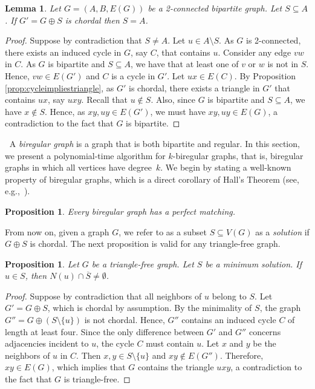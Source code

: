\documentclass[11pt]{article}
\newtheorem{lemma}[theorem]{Lemma}
\newtheorem{proposition}[theorem]{Proposition}
\theoremstyle{definition}
\begin{document}
\begin{lemma}\label{lemma:SsubseteqAthenS=A}
Let $G=(A,B,E(G))$ be a 2-connected bipartite graph. Let $S \subseteq A$.
If $G'=G \oplus S$ is chordal then $S=A$.
\end{lemma}
\begin{proof}
    Suppose by contradiction that 
    $S \neq  A$.
    Let $u \in A \setminus S$.
    As $G$ is 2-connected, there exists an induced cycle in $G$, say $C$, that contains $u$.
    Consider any edge $vw$ in $C$.
    As $G$ is bipartite and $S \subseteq A$, we have that at least one of $v$ or $w$ is not in $S$. Hence, $vw \in E(G')$ and $C$ is a cycle in $G'$.
    Let $ux \in E(C)$.
    By Proposition \ref{prop:cycleimpliestriangle}, as $G'$ is chordal, there exists a triangle in $G'$ that contains $ux$, say $uxy$.
    Recall that $u \notin S$.
    Also, since $G$ is bipartite and $S \subseteq A$, we have $x \notin S$. Hence, as $xy,uy \in E(G')$, we must have $xy,uy \in E(G)$, a contradiction to the fact that $G$ is bipartite.
\end{proof}

$~$
A \textit{biregular graph} is a graph that is both bipartite and regular.
In this section, we present a polynomial-time algorithm for $k$-biregular graphs, that is, biregular graphs in which all vertices have degree~$k$.
We begin by stating a well-known property of biregular graphs, which is a direct corollary of Hall’s Theorem (see, e.g.,~\cite{LovaszPlummer1986}).

\begin{proposition}\label{prop:regularbip-perfectmatch}
Every biregular graph has a perfect matching.
\end{proposition}

From now on, given a graph $G$, we refer to as a subset $S \subseteq V(G)$
as a \emph{solution} if $G \oplus S$ is chordal.
The next proposition is valid for any triangle-free graph.

\begin{proposition}\label{prop:minimality-kreg}
Let $G$ be a triangle-free graph.
Let $S$ be a minimum solution.
If $u \in S$, then $N(u) \cap \overline{S} \neq \emptyset$.
\end{proposition}
\begin{proof}
Suppose by contradiction that all neighbors of $u$ belong to $S$.
Let $G' = G \oplus S$, which is chordal by assumption.
By the minimality of $S$, the graph $G'' = G \oplus (S \setminus \{u\})$ is not chordal.
Hence, $G''$ contains an induced cycle $C$ of length at least four.
Since the only difference between $G'$ and $G''$ concerns adjacencies incident to $u$,
the cycle $C$ must contain $u$.
Let $x$ and $y$ be the neighbors of $u$ in $C$.
Then $x,y \in S \setminus \{u\}$ and $xy \notin E(G'')$.
Therefore, $xy \in E(G)$, which implies that $G$ contains the triangle $uxy$,
a contradiction to the fact that $G$ is triangle-free.
\end{proof}
\end{document}
